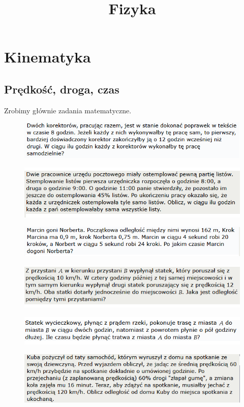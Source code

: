 \documentclass[11pt]{article}
\title{Fizyka}
\theoremstyle{definition}
\numberwithin{zad}{section}
\begin{document}
\maketitle
\tableofcontents

\section{Kinematyka}

\subsection{Prędkość, droga, czas}

Zrobimy głównie zadania matematyczne.

\begin{figure}[H]
\centering
\includegraphics[width=0.8\linewidth]{./svt/zad1.png}
\end{figure}
\begin{figure}[H]
\centering
\includegraphics[width=0.8\linewidth]{./svt/zad2.png}
\end{figure}
\begin{figure}[H]
\centering
\includegraphics[width=0.8\linewidth]{./svt/zad3.png}
\end{figure}
\begin{figure}[H]
\centering
\includegraphics[width=0.8\linewidth]{./svt/zad4.png}
\end{figure}
\begin{figure}[H]
\centering
\includegraphics[width=0.8\linewidth]{./svt/zad5.png}
\end{figure}
\begin{figure}[H]
\centering
\includegraphics[width=0.8\linewidth]{./svt/zad6.png}
\end{figure}
\end{document}
